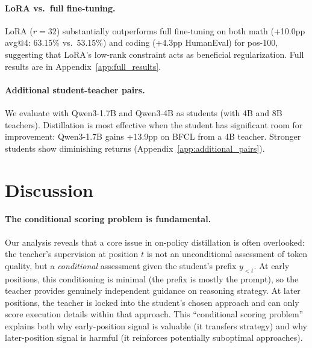 \documentclass[10pt]{article}
\begin{document}
\paragraph{LoRA vs.\ full fine-tuning.} LoRA ($r{=}32$) substantially outperforms full fine-tuning on both math (+10.0pp avg@4: 63.15\% vs.\ 53.15\%) and coding (+4.3pp HumanEval) for pos-100, suggesting that LoRA's low-rank constraint acts as beneficial regularization. Full results are in Appendix~\ref{app:full_results}.

\paragraph{Additional student-teacher pairs.} We evaluate with Qwen3-1.7B and Qwen3-4B as students (with 4B and 8B teachers). Distillation is most effective when the student has significant room for improvement: Qwen3-1.7B gains +13.9pp on BFCL from a 4B teacher. Stronger students show diminishing returns (Appendix~\ref{app:additional_pairs}).





\section{Discussion}
\label{sec:discussion}

\paragraph{The conditional scoring problem is fundamental.} Our analysis reveals that a core issue in on-policy distillation is often overlooked: the teacher's supervision at position $t$ is not an unconditional assessment of token quality, but a \emph{conditional} assessment given the student's prefix $y_{<t}$. At early positions, this conditioning is minimal (the prefix is mostly the prompt), so the teacher provides genuinely independent guidance on reasoning strategy. At later positions, the teacher is locked into the student's chosen approach and can only score execution details within that approach. This ``conditional scoring problem'' explains both why early-position signal is valuable (it transfers strategy) and why later-position signal is harmful (it reinforces potentially suboptimal approaches).
\end{document}
